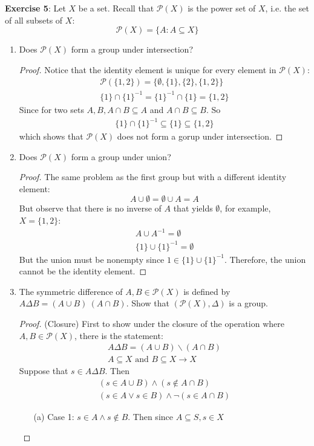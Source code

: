\documentclass{article}
\begin{document}
\textbf{Exercise 5}: Let $X$ be a set. Recall that $\mathcal{P}(X)$ is the power set of $X$, i.e. the set of all subsets of $X$:
\begin{equation*}
	\mathcal{P}(X) = \{A : A \subseteq X\}
\end{equation*}
\begin{enumerate}
	\item Does $\mathcal{P}(X)$ form a group under intersection?
		\begin{proof}
			Notice that the identity element is unique for every element in $\mathcal{P}(X)$:
			\begin{align*}
				\mathcal{P}(\{1, 2\}) = \{\emptyset, \{1\}, \{2\}, \{1, 2\}\} \\
				\{1\} \cap \{1\}^{-1} = \{1\}^{-1} \cap \{1\} = \{1, 2\}
			\end{align*}
			Since for two sets $A, B, A \cap B \subseteq A$ and $A \cap B \subseteq B$. So 
			\begin{align*}
				\{1\} \cap \{1\}^{-1} \subseteq \{1\} \subseteq \{1, 2\}
			\end{align*}
			which shows that $\mathcal{P}(X)$ does not form a gorup under intersection.
		\end{proof}
	\item Does $\mathcal{P}(X)$ form a group under union?
		\begin{proof}
			The same problem as the first group but with a different identity element:
			\begin{equation*}
				A \cup \emptyset = \emptyset \cup A = A
			\end{equation*}
			But observe that there is no inverse of $A$ that yields $\emptyset$, for example, $X = \{1, 2\}$:
			\begin{align*}
				A \cup A^{-1} = \emptyset \\
				\{1\} \cup \{1\}^{-1} = \emptyset
			\end{align*}
			But the union must be nonempty since $1 \in \{1\} \cup \{1\}^{-1}$. Therefore, the union cannot be the identity element.
		\end{proof}
	\item The symmetric difference of $A, B \in \mathcal{P}(X)$ is defined by $A \Delta B = (A \cup B) \ (A \cap B)$. Show that $(\mathcal{P}(X), \Delta)$ is a group.
		\begin{proof}
			(Closure) First to show under the closure of the operation where $A, B \in \mathcal{P}(X)$, there is the statement:
			\begin{align*}
				A \Delta B = (A \cup B) \backslash (A \cap B) \\
				A \subseteq X \text{ and } B \subseteq X \rightarrow X
			\end{align*}
			Suppose that $s \in A \Delta B$. Then 
			\begin{align*}
				(s \in A \cup B) \land (s \notin A \cap B) \\
				(s \in A \lor s \in B) \land \lnot (s \in A \cap B) 
			\end{align*}
			\begin{enumerate}
				\item [(a)] Case 1: $s \in A \land s \notin B$. Then since $A \subseteq S, s \in X$


\end{enumerate}
\end{proof}
\end{enumerate}
\end{document}
